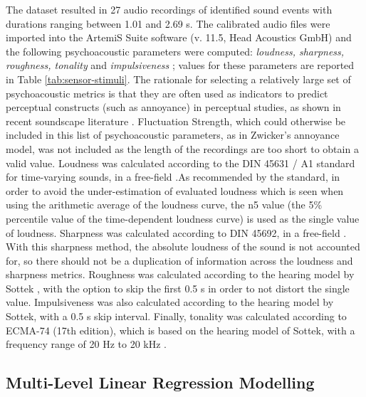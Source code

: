    The dataset resulted in 27 audio recordings of identified sound events with durations ranging between 1.01 and 2.69 s. The calibrated audio files were imported into the ArtemiS Suite software (v. 11.5, Head Acoustics GmbH) and the following psychoacoustic parameters were computed: \emph{loudness, sharpness, roughness, tonality} and \emph{impulsiveness} ; values for these parameters are reported in Table \ref{tab:sensor-stimuli}. The rationale for selecting a relatively large set of psychoacoustic metrics is that they are often used as indicators to predict perceptual constructs (such as annoyance) in perceptual studies, as shown in recent soundscape literature . Fluctuation Strength, which could otherwise be included in this list of psychoacoustic parameters, as in Zwicker's annoyance model, was not included as the length of the recordings are too short to obtain a valid value. Loudness was calculated according to the DIN 45631 / A1 standard for time-varying sounds, in a free-field .As recommended by the standard, in order to avoid the under-estimation of evaluated loudness which is seen when using the arithmetic average of the loudness curve, the \gls{n5} value (the 5\% percentile value of the time-dependent loudness curve) is used as the single value of loudness. Sharpness was calculated according to DIN 45692, in a free-field . With this sharpness method, the absolute loudness of the sound is not accounted for, so there should not be a duplication of information across the loudness and sharpness metrics. Roughness was calculated according to the hearing model by Sottek , with the option to skip the first 0.5 s in order to not distort the single value. Impulsiveness was also calculated according to the hearing model by Sottek, with a 0.5 s skip interval. Finally, tonality was calculated according to ECMA-74 (17th edition), which is based on the hearing model of Sottek, with a frequency range of 20 Hz to 20 kHz .

 \subsection{Multi-Level Linear Regression Modelling}

